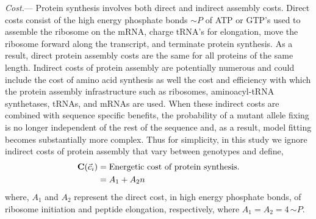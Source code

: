 \documentclass[12pt,letterpaper]{article}
\renewcommand{\subsubsection}[1]{%
\vspace{2ex}
\noindent
\textit{#1.}---}
\newcommand{\Costcveci}{\ensuremath{\Cost(\cveci)}\xspace}
\newcommand{\Cost}{\ensuremath{\text{\textbf{C}}}\xspace}
\newcommand{\simP}{\ensuremath{\sim P}\xspace}
\newcommand{\cveci}{\ensuremath{\cvec_i}\xspace}
\newcommand{\cvec}{\ensuremath{\Vec{c}}\xspace}
\begin{document}
\subsubsection{Cost}
Protein synthesis involves both direct and indirect assembly costs.
Direct costs consist of the high energy phosphate bonds \simP of ATP or GTP's used to assemble the ribosome on the mRNA, charge tRNA's for elongation, move the ribosome forward along the transcript, and terminate protein synthesis.
As a result, direct protein assembly costs are the same for all proteins of the same length.
Indirect costs of protein assembly are potentially numerous and could include the cost of amino acid synthesis as well the cost and efficiency with which the protein assembly infrastructure such as ribosomes, aminoacyl-tRNA synthetases, tRNAs, and mRNAs are used.
When these indirect costs are combined with sequence specific benefits, the probability of a mutant allele fixing is no longer independent of the rest of the sequence \citep{GilchristEtAl2015} and, as a result, model fitting becomes substantially more complex.
Thus for simplicity, in this study we ignore indirect costs of protein assembly that vary between genotypes and define,
\begin{align}
\label{eq:defineCost}
  \Costcveci  &= \text{Energetic cost of protein synthesis.}\\
  &= A_1 + A_2 n
\end{align}
where, $A_1$ and $A_2$ represent the direct cost, in high energy phosphate bonds, of ribosome initiation and peptide elongation, respectively, where $A_1 = A_2 = 4  \, \simP$.
\end{document}

